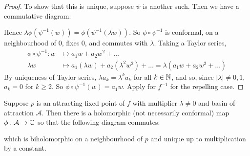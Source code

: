 \documentclass[10pt,a4paper]{article}
\begin{document}
\begin{proof}
  To show that this is unique, suppose $\psi$ is another such. Then we have a commutative diagram:
  \begin{center}
    \hspace{2cm}
  \end{center}
  Hence $\lambda\phi(\psi^{-1}(w)) = \phi(\psi^{-1}(\lambda w))$. So $\phi\circ \psi^{-1}$ is conformal, on a neighbourhood of $0$, fixes 0, and commutes with $\lambda$. Taking a Taylor series,
  \begin{align*}
    \phi\circ \psi^{-1}: w &\mapsto a_1 w+ a_2w^2 + \ldots\\
    \lambda w &\mapsto a_1(\lambda w) + a_2(\lambda^2 w^2) +\ldots = \lambda(a_1 w + a_2 w^2 + \ldots)
  \end{align*}
  By uniqueness of Taylor series, $\lambda a_k = \lambda^k a_k$ for all $k \in \mathbb{N}$, and so, since $|\lambda| \neq 0,1$, $a_k = 0$ for $k \geq 2$. So $\phi\circ \psi^{-1}(w) = a_1 w$. Apply for $f^{-1}$ for the repelling case.
\end{proof}
\begin{corollary}
  Suppose $p$ is an attracting fixed point of $f$ with multiplier $\lambda \neq 0$ and basin of attraction $\mathcal{A}$. Then there is a holomorphic (not necessarily conformal) map $\phi:\mathcal{A}\to \mathbb{C}$ so that the following diagram commutes:
  \begin{center}
  \end{center}
  which is biholomorphic on a neighbourhood of $p$ and unique up to multiplication by a constant.
\end{corollary}
\end{document}
